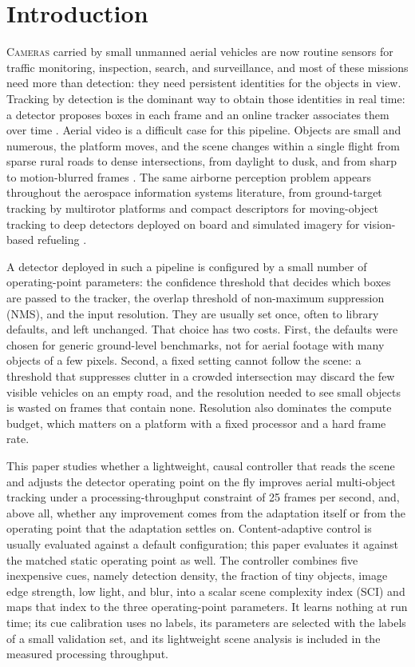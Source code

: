\documentclass[journal]{new-aiaa}
\begin{document}
\section{Introduction}
\lettrine{C}{ameras} carried by small unmanned aerial vehicles are now routine sensors for traffic monitoring, inspection, search, and surveillance, and most of these missions need more than detection: they need persistent identities for the objects in view. Tracking by detection is the dominant way to obtain those identities in real time: a detector proposes boxes in each frame and an online tracker associates them over time \cite{bewley2016sort,wojke2017deepsort,zhang2022bytetrack}. Aerial video is a difficult case for this pipeline. Objects are small and numerous, the platform moves, and the scene changes within a single flight from sparse rural roads to dense intersections, from daylight to dusk, and from sharp to motion-blurred frames \cite{zhu2022visdrone,du2018uavdt,wu2022uavsurvey}. The same airborne perception problem appears throughout the aerospace information systems literature, from ground-target tracking by multirotor platforms \cite{miller2015multitarget} and compact descriptors for moving-object tracking \cite{desai2017uavfeature} to deep detectors deployed on board \cite{choi2022docking,lu2024uavdetection} and simulated imagery for vision-based refueling \cite{parsons2019refueling}.

A detector deployed in such a pipeline is configured by a small number of operating-point parameters: the confidence threshold that decides which boxes are passed to the tracker, the overlap threshold of non-maximum suppression (NMS), and the input resolution. They are usually set once, often to library defaults, and left unchanged. That choice has two costs. First, the defaults were chosen for generic ground-level benchmarks, not for aerial footage with many objects of a few pixels. Second, a fixed setting cannot follow the scene: a threshold that suppresses clutter in a crowded intersection may discard the few visible vehicles on an empty road, and the resolution needed to see small objects is wasted on frames that contain none. Resolution also dominates the compute budget, which matters on a platform with a fixed processor and a hard frame rate.

This paper studies whether a lightweight, causal controller that reads the scene and adjusts the detector operating point on the fly improves aerial multi-object tracking under a processing-throughput constraint of 25 frames per second, and, above all, whether any improvement comes from the adaptation itself or from the operating point that the adaptation settles on. Content-adaptive control is usually evaluated against a default configuration; this paper evaluates it against the matched static operating point as well. The controller combines five inexpensive cues, namely detection density, the fraction of tiny objects, image edge strength, low light, and blur, into a scalar scene complexity index (SCI) and maps that index to the three operating-point parameters. It learns nothing at run time; its cue calibration uses no labels, its parameters are selected with the labels of a small validation set, and its lightweight scene analysis is included in the measured processing throughput.
\end{document}
